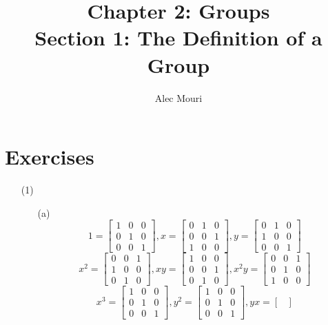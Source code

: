 \documentclass[12pt]{article}
\begin{document}
\title{Chapter 2: Groups \\ Section 1: The Definition of a Group}
\author{Alec Mouri}

\maketitle
\section*{Exercises}
\begin{itemize}
\item[(1)]
\begin{itemize}
\item[(a)]
$$1 = \begin{bmatrix}
1 & 0 & 0 \\
0 & 1 & 0 \\
0 & 0 & 1
\end{bmatrix}, x = \begin{bmatrix}
0 & 1 & 0 \\
0 & 0 & 1 \\
1 & 0 & 0
\end{bmatrix}, y = \begin{bmatrix}
0 & 1 & 0 \\
1 & 0 & 0 \\
0 & 0 & 1
\end{bmatrix}$$
$$x^2 = \begin{bmatrix}
0 & 0 & 1 \\
1 & 0 & 0 \\
0 & 1 & 0
\end{bmatrix}, xy = \begin{bmatrix}
1 & 0 & 0 \\
0 & 0 & 1 \\
0 & 1 & 0
\end{bmatrix}, x^2y = \begin{bmatrix}
0 & 0 & 1 \\
0 & 1 & 0 \\
1 & 0 & 0
\end{bmatrix}$$
$$x^3 = \begin{bmatrix}
1 & 0 & 0 \\
0 & 1 & 0 \\
0 & 0 & 1
\end{bmatrix}, y^2 = \begin{bmatrix}
1 & 0 & 0 \\
0 & 1 & 0 \\
0 & 0 & 1
\end{bmatrix}, yx = \begin{bmatrix}

\end{bmatrix}$$
\end{itemize}
\end{itemize}
\end{document}
